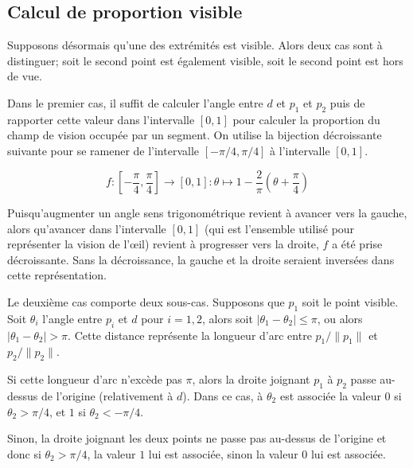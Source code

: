 \subsection{Calcul de proportion visible}

Supposons désormais qu'une des extrémités est visible.
Alors deux cas sont à distinguer; soit le second point est également
visible, soit le second point est hors de vue.

Dans le premier cas, il suffit de calculer l'angle entre $d$ et
$p_1$ et $p_2$ puis de rapporter cette valeur dans l'intervalle
$[0, 1]$ pour calculer la proportion du champ de vision occupée
par un segment. On utilise la bijection décroissante suivante
pour se ramener de l'intervalle $[-\pi/4, \pi/4]$ à l'intervalle
$[0, 1]$.

$$f:\left[-\frac{\pi}{4}, \frac{\pi}{4}\right]\to [0, 1]: \theta \mapsto 1 - \frac{2}{\pi}\left(\theta + \frac{\pi}{4}\right)$$

Puisqu'augmenter un angle
sens trigonométrique revient à avancer vers la gauche, alors qu'avancer
dans l'intervalle $[0, 1]$ (qui est l'ensemble utilisé pour représenter
la vision de l'\oe{}il) revient à progresser vers la droite, $f$ a été prise
décroissante. Sans la décroissance, la gauche et la droite seraient inversées
dans cette représentation.

Le deuxième cas comporte deux sous-cas. Supposons que $p_1$
soit le point visible. Soit $\theta_i$ l'angle entre
$p_i$ et $d$ pour $i=1, 2$, alors soit $|\theta_1 - \theta_2|\leq\pi$,
ou alors $|\theta_1 - \theta_2|>\pi$. Cette distance représente
la longueur d'arc entre $p_1/\|p_1\|$ et $p_2/\|p_2\|$.

Si cette longueur d'arc n'excède pas $\pi$, alors la droite
joignant $p_1$ à $p_2$ passe au-dessus de l'origine (relativement
à $d$). Dans ce cas, à $\theta_2$ est associée la valeur $0$
si $\theta_2 > \pi/4$, et $1$ si $\theta_2 < -\pi/4$.

Sinon, la droite joignant les deux points ne passe pas au-dessus de l'origine
et donc si $\theta_2 >\pi/4$, la valeur $1$ lui est associée, sinon la valeur
$0$ lui est associée.
